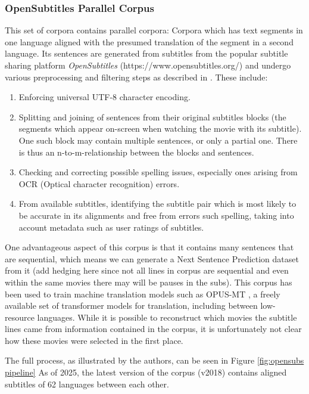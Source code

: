 \subsubsection{OpenSubtitles Parallel Corpus}
This set of corpora contains parallel corpora:
Corpora which has text segments in one language aligned with the presumed translation of the segment in a second language.
Its sentences are generated from subtitles from the popular subtitle sharing platform \textit{OpenSubtitles} (https://www.opensubtitles.org/) and undergo various preprocessing and filtering steps as described in \cite{lisonOpensubtitles2016ExtractingLarge2016}.
These include:
\begin{enumerate}
	\item Enforcing universal UTF-8 character encoding.
	\item
	      Splitting and joining of sentences from their original subtitles blocks (the segments which appear on-screen when watching the movie with its subtitle).
	      One such block may contain multiple sentences, or only a partial one.
	      There is thus an n-to-m-relationship between the blocks and sentences.
	\item Checking and correcting possible spelling issues, especially ones arising from OCR (Optical character recognition) errors.
	\item From available subtitles, identifying the subtitle pair which is most likely to be accurate in its alignments and free from errors such spelling, taking into account metadata such as user ratings of subtitles.

\end{enumerate}
One advantageous aspect of this corpus is that it contains many sentences that are sequential, which means we can generate a Next Sentence Prediction dataset from it (add hedging here since not all lines in corpus are sequential and even within the same movies there may will be pauses in the subs).
This corpus has been used to train machine translation models such as OPUS-MT \cite{tiedemannOPUSMTbuildingOpenTranslation2020}, a freely available set of transformer models for translation, including between low-resource languages. 
While it is possible to reconstruct which movies the subtitle lines came from information contained in the corpus, it is unfortunately not clear how these movies were selected in the first place.


The full process, as illustrated by the authors, can be seen in Figure \ref{fig:opensubs pipeline}
As of 2025, the latest version of the corpus (v2018) contains aligned subtitles of 62 languages between each other.

